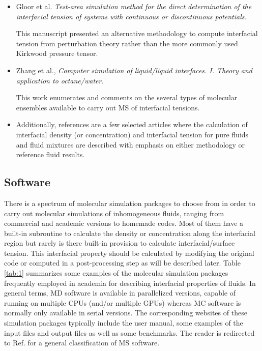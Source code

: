 \documentclass[9pt,bestpractices]{livecoms}
\begin{document}
\begin{itemize}
\item Gloor et al. \textit{Test-area simulation method for the direct determination of the interfacial tension of systems with continuous or discontinuous potentials.} \citep{gloor2005}
  
  This manuscript presented an alternative methodology to compute interfacial tension from perturbation theory rather than the more commonly used Kirkwood pressure tensor.

\item Zhang et al., \textit{Computer simulation of liquid/liquid interfaces. I. Theory and application to octane/water.} \citep{zhang1995}

  This work enumerates and comments on the several types of molecular ensembles available to carry out MS of interfacial tensions.

\item Additionally, references \citep{walton1983,chapela1977,trokhymchuk1999,mecke1997,mecke1999,duque2004,errington2007,stephan2019} are a few
  selected articles where the calculation of interfacial density (or
  concentration) and interfacial tension for pure fluids and fluid mixtures are
  described with emphasis on either methodology or reference fluid results. 

\end{itemize}

\subsection{Software}
There is
a spectrum of molecular simulation packages to choose from
in order to carry out molecular simulations of inhomogeneous fluids,
ranging from commercial and academic
versions to homemade codes. Most of them have a built-in subroutine to
calculate the density or concentration along the interfacial region but rarely
is there built-in provision to calculate interfacial/surface tension. This
interfacial property should be calculated by modifying the original code or
computed in a post-processing step as will be described later. Table
\ref{tab:1} summarizes some examples of the molecular simulation packages frequently
employed in academia for describing interfacial properties of fluids. In
general terms, MD software is available in parallelized versions, capable of
running on multiple CPUs (and/or multiple GPUs) whereas MC software is normally
only available in serial versions. The corresponding websites of these
simulation packages typically include the user manual, some examples of the input
files and output files as well as some benchmarks. The reader is redirected to
Ref. \citep{wiki} for a general classification of MS software. 
\end{document}
